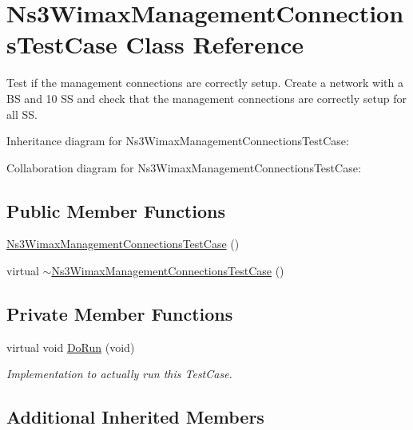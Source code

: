 \hypertarget{classNs3WimaxManagementConnectionsTestCase}{}\section{Ns3\+Wimax\+Management\+Connections\+Test\+Case Class Reference}
\label{classNs3WimaxManagementConnectionsTestCase}


Test if the management connections are correctly setup. Create a network with a BS and 10 SS and check that the management connections are correctly setup for all SS.  




Inheritance diagram for Ns3\+Wimax\+Management\+Connections\+Test\+Case\+:


Collaboration diagram for Ns3\+Wimax\+Management\+Connections\+Test\+Case\+:
\subsection*{Public Member Functions}
\begin{DoxyCompactItemize}
\item 
\hyperlink{classNs3WimaxManagementConnectionsTestCase_ab6e8517b8cd07d66cee66fe39a5609b7}{Ns3\+Wimax\+Management\+Connections\+Test\+Case} ()
\item 
virtual \hyperlink{classNs3WimaxManagementConnectionsTestCase_ae97a292bfc309c945245c96fb6d173e7}{$\sim$\+Ns3\+Wimax\+Management\+Connections\+Test\+Case} ()
\end{DoxyCompactItemize}
\subsection*{Private Member Functions}
\begin{DoxyCompactItemize}
\item 
virtual void \hyperlink{classNs3WimaxManagementConnectionsTestCase_a5f8fe33e0feb16c9ef0558097d9bbaca}{Do\+Run} (void)
\begin{DoxyCompactList}\small\item\em Implementation to actually run this Test\+Case. \end{DoxyCompactList}\end{DoxyCompactItemize}
\subsection*{Additional Inherited Members}


